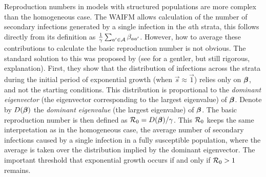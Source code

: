\documentclass[thesis.tex]{subfiles}
\begin{document}
Reproduction numbers in models with structured populations are more complex than the homogeneous case.
The WAIFM allows calculation of the number of secondary infections generated by a single infection in the $a$th strata,  this follows directly from its definition as $\frac{1}{\gamma} \sum_{a' \in \mathcal{A}} \beta_{aa'}$. 
However, how to average these contributions to calculate the basic reproduction number is not obvious.
The standard solution to this was proposed by \textcite{diekmannDefinition} (see \textcite[chapter 7]{diekmannMathematical} for a gentler, but still rigorous, explanation).
First, they show that the distribution of infections across the strata during the initial period of exponential growth (when $\vec{s} \approx \vec{1}$) relies only on $\bm{\beta}$, and not the starting conditions.
This distribution is proportional to the \emph{dominant eigenvector} (the eigenvector corresponding to the largest eigenvalue) of $\bm{\beta}$.
Denote by $D(\bm{\beta})$ the \emph{dominant eigenvalue} (the largest eigenvalue) of $\bm{\beta}$.
The basic reproduction number is then defined as $\mathcal{R}_{0} = D(\bm{\beta}) / \gamma$.
This $\mathcal{R}_{0}$ keeps the same interpretation as in the homogeneous case, \ie the average number of secondary infections caused by a single infection in a fully susceptible population, where the average is taken over the distribution implied by the dominant eigenvector.
The important threshold that exponential growth occurs if and only if $\mathcal{R}_{0} > 1$ remains.
\end{document}
